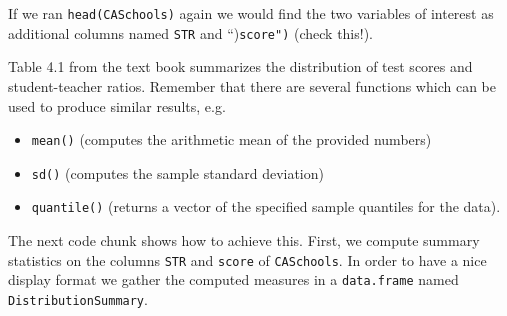 \documentclass[]{book}
\theoremstyle{definition}
\theoremstyle{definition}
\theoremstyle{definition}
\theoremstyle{remark}
\begin{document}
If we ran \texttt{head(CASchools)} again we would find the two variables
of interest as additional columns named \texttt{STR} and
``)\texttt{score")} (check this!).

Table 4.1 from the text book summarizes the distribution of test scores
and student-teacher ratios. Remember that there are several functions
which can be used to produce similar results, e.g.

\begin{itemize}
\item
  \texttt{mean()} (computes the arithmetic mean of the provided numbers)
\item
  \texttt{sd()} (computes the sample standard deviation)
\item
  \texttt{quantile()} (returns a vector of the specified sample
  quantiles for the data).
\end{itemize}

The next code chunk shows how to achieve this. First, we compute summary
statistics on the columns \texttt{STR} and \texttt{score} of
\texttt{CASchools}. In order to have a nice display format we gather the
computed measures in a \texttt{data.frame} named
\texttt{DistributionSummary}.
\end{document}
